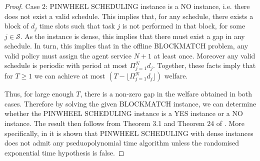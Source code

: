 \documentclass[letterpaper,11pt]{article}
\begin{document}
\begin{proof}
    Case 2: PINWHEEL SCHEDULING instance is a NO instance, i.e. there does not exist a valid schedule. This implies that, for any schedule, there exists a block of $d_{j}$ time slots such that task $j$ is not performed in that block, for some $j \in \mathcal{S}$. As the instance is dense, this implies that there must exist a gap in any schedule. In turn, this implies that in the offline BLOCKMATCH problem, any valid policy must assign the agent service $N+1$ at least once. Moreover any valid schedule is periodic with period at most $\Pi^{N}_{j=1}d_{j}$. Together, these facts imply that for $T \geq 1$ we can achieve at most $\left(T - \lfloor{\Pi^{N}_{j=1}d_{j}}\rfloor \right)$ welfare.
    
    Thus, for large enough $T$, there is a non-zero gap in the welfare obtained in both cases. Therefore by solving the given BLOCKMATCH instance, we can determine whether the PINWHEEL SCHEDULING instance is a YES instance or a NO instance. The result then follows from  Theorem 3.1 and Theorem 24 of \cite{pinwheel2}. More specifically, in \cite{pinwheel2} it is shown that PINWHEEL  SCHEDULING with dense instances does not admit any pseduopolynomial time algorithm unless the randomised exponential time hypothesis is false.
\end{proof}
\fi
\end{document}
